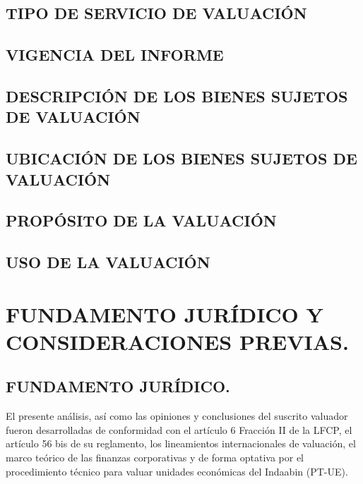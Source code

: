 \documentclass[10pt,letter]{report}
\begin{document}
\begin{enumerate}[a.]
\section{TIPO DE SERVICIO DE VALUACI\'ON}\label{sec:d}


\section{VIGENCIA DEL INFORME}\label{sec:e}



\section{DESCRIPCI\'ON DE LOS BIENES SUJETOS DE VALUACI\'ON}\label{sec:f}


\section{UBICACI\'ON DE LOS BIENES SUJETOS DE VALUACI\'ON}\label{sec:g}


\section{PROP\'OSITO DE LA VALUACI\'ON}\label{sec:h}


\section{USO DE LA VALUACI\'ON}\label{sec:i}


\espacio{4cm}

\chapter{FUNDAMENTO JUR\'IDICO Y CONSIDERACIONES PREVIAS.}\label{cap:3}
\thispagestyle{fancy}
\setcounter{section}{9}

\section*{FUNDAMENTO JUR\'IDICO.}\label{sec:juridico}
El presente an\'alisis, as\'i como las opiniones y conclusiones del suscrito valuador fueron desarrolladas de conformidad con el art\'iculo 6 Fracci\'on II de la LFCP, el art\'iculo 56 bis de su reglamento, los lineamientos internacionales de valuaci\'on, el marco te\'orico de las finanzas corporativas y de forma optativa por el procedimiento t\'ecnico para valuar unidades econ\'omicas del Indaabin (PT-UE).\\


\end{enumerate}
\end{document}
